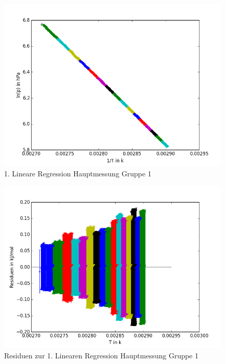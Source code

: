 \documentclass[12pt,a4paper]{article}
\begin{document}
\begin{figure}[H]
\centering
\includegraphics[scale=0.7]{Bilder/linreg_lambda_JM_1.png}
\caption{1. Lineare Regression Hauptmessung Gruppe 1}
\end{figure}
\begin{figure}[H]
\centering
\includegraphics[scale=0.7]{Bilder/residuen_JM_1.png}
\caption{Residuen zur 1. Linearen Regression Hauptmessung Gruppe 1}
\end{figure}
\end{document}
